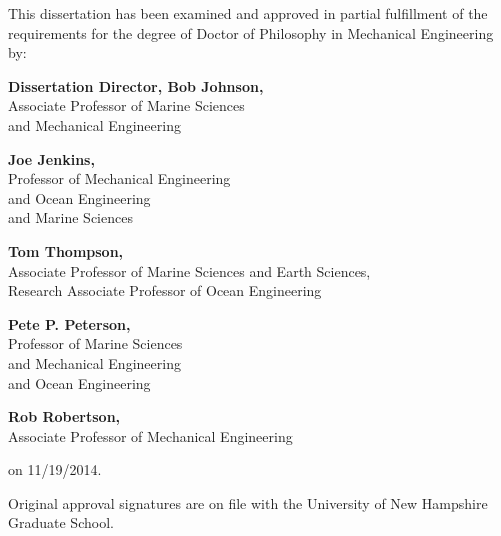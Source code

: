 \newpage
\vspace*{0.75 in}

\begin{singlespace}


\noindent \small{This dissertation has been examined and approved in partial fulfillment of the requirements for the degree of Doctor of Philosophy in Mechanical Engineering by:}
\vspace{0.5in}

\hfill                                      %
\parbox{4in} {                               %
\textbf{Dissertation Director, Bob Johnson,}\\ \small{Associate Professor of Marine Sciences\\ and Mechanical Engineering}
\vspace{0.2in}

 {\textbf{Joe Jenkins,}\\ \small{Professor of Mechanical Engineering \\ and Ocean Engineering\\ and Marine Sciences}}
\vspace{0.2in}

 {\textbf{Tom Thompson,}\\   \small{Associate Professor of Marine Sciences and Earth Sciences,\\ Research Associate Professor of Ocean Engineering}}
\vspace{0.2in}

 {\textbf{Pete P. Peterson,}\\  \small {Professor of Marine Sciences\\ and Mechanical Engineering\\ and Ocean Engineering}}
\vspace{0.2in}

{\textbf{Rob Robertson,}\\   \small{Associate Professor of Mechanical
Engineering}}

\vspace{0.2in}
         on 11/19/2014.\\}


\vspace{0.5 in}
\noindent \small{Original approval signatures are on file with the University of New Hampshire Graduate School.}


\end{singlespace}
\vspace*{\fill}
